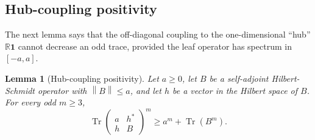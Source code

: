 \documentclass[11pt]{article}
\newtheorem{lemma}[theorem]{Lemma}
\theoremstyle{definition}
\theoremstyle{remark}
\newcommand{\one}{\mathbf 1}
\newcommand{\R}{\mathbb R}
\newcommand{\Tr}{\operatorname{Tr}}
\newcommand{\norm}[1]{\left\lVert #1\right\rVert}
\newcommand{\0}{\mathbf 0}
\begin{document}
\subsection{Hub-coupling positivity}

The next lemma says that the off-diagonal coupling to the one-dimensional ``hub'' $\R\one$ cannot decrease an odd trace, provided the leaf operator has spectrum in $[-a,a]$.

\begin{lemma}[Hub-coupling positivity]\label{lem:hub-coupling}
Let $a\ge0$, let $B$ be a self-adjoint Hilbert-Schmidt operator with $\norm B\le a$, and let $h$ be a vector in the Hilbert space of $B$.  For every odd $m\ge3$,
\begin{equation}\label{eq:hub-coupling}
        \Tr
        \begin{pmatrix}
        a & h^*\\
        h & B
        \end{pmatrix}^m
        \ge
        a^m+\Tr(B^m).
\end{equation}
\end{lemma}
\end{document}
